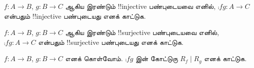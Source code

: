\documentclass[../../../include/open-logic-section]{subfiles}
\begin{document}
\begin{prob}
$f \colon A \to B$, $g \colon B \to C$ ஆகிய இரண்டும்
!!{injective} பண்புடையவை எனில்,
$\comp{f}{g}\colon A \to C$ என்பதும் !!{injective} பண்புடையது
எனக் காட்டுக.
\end{prob}

\begin{prob}
$f \colon A \to B$, $g \colon B \to C$ ஆகிய இரண்டும்
!!{surjective} பண்புடையவை எனில்,
$\comp{f}{g}\colon A \to C$ என்பதும் !!{surjective} பண்புடையது
எனக் காட்டுக.
\end{prob}

\begin{prob}
$f \colon A \to B$, $g \colon B \to C$ எனக் கொள்வோம்.
$\comp{f}{g}$ இன் கோட்டுரு $R_f \mid R_g$ எனக் காட்டுக.
\end{prob}
\end{document}
